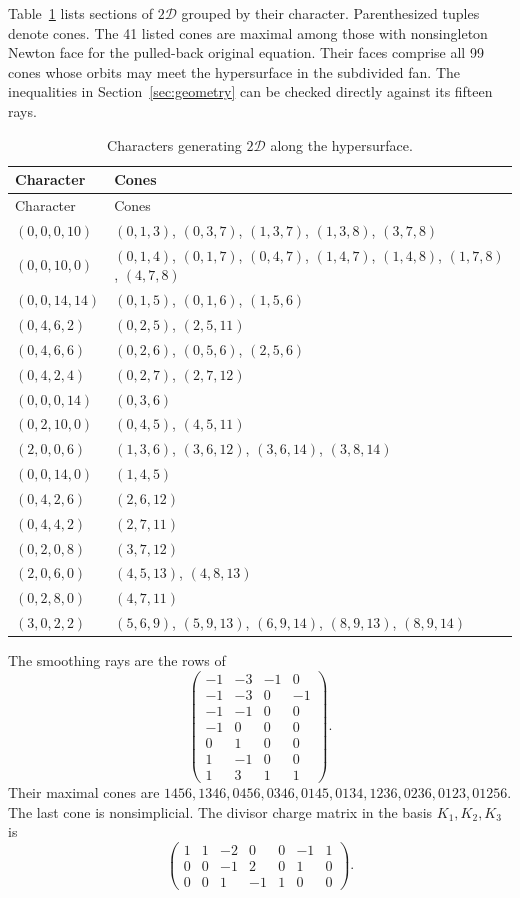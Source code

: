 Table~\ref{tab:characters} lists sections of $2\mathcal D$ grouped
by their character. Parenthesized tuples denote cones. The 41 listed
cones are maximal among those with nonsingleton Newton face for the
pulled-back original equation. Their faces comprise all 99 cones whose
orbits may meet the hypersurface in the subdivided fan. The inequalities in Section~\ref{sec:geometry} can
be checked directly against its fifteen rays.
\begingroup\small
\begin{longtable}{p{}p{}}
\caption{Characters generating $2\mathcal D$ along the hypersurface.}
\label{tab:characters}\\
\toprule Character & Cones\\\midrule\endfirsthead
\toprule Character & Cones\\\midrule\endhead
$(0,0,0,10)$ & $(0,1,3)$, $(0,3,7)$, $(1,3,7)$, $(1,3,8)$, $(3,7,8)$\\[3pt]
$(0,0,10,0)$ & $(0,1,4)$, $(0,1,7)$, $(0,4,7)$, $(1,4,7)$, $(1,4,8)$, $(1,7,8)$, $(4,7,8)$\\[3pt]
$(0,0,14,14)$ & $(0,1,5)$, $(0,1,6)$, $(1,5,6)$\\[3pt]
$(0,4,6,2)$ & $(0,2,5)$, $(2,5,11)$\\[3pt]
$(0,4,6,6)$ & $(0,2,6)$, $(0,5,6)$, $(2,5,6)$\\[3pt]
$(0,4,2,4)$ & $(0,2,7)$, $(2,7,12)$\\[3pt]
$(0,0,0,14)$ & $(0,3,6)$\\[3pt]
$(0,2,10,0)$ & $(0,4,5)$, $(4,5,11)$\\[3pt]
$(2,0,0,6)$ & $(1,3,6)$, $(3,6,12)$, $(3,6,14)$, $(3,8,14)$\\[3pt]
$(0,0,14,0)$ & $(1,4,5)$\\[3pt]
$(0,4,2,6)$ & $(2,6,12)$\\[3pt]
$(0,4,4,2)$ & $(2,7,11)$\\[3pt]
$(0,2,0,8)$ & $(3,7,12)$\\[3pt]
$(2,0,6,0)$ & $(4,5,13)$, $(4,8,13)$\\[3pt]
$(0,2,8,0)$ & $(4,7,11)$\\[3pt]
$(3,0,2,2)$ & $(5,6,9)$, $(5,9,13)$, $(6,9,14)$, $(8,9,13)$, $(8,9,14)$\\[3pt]
\bottomrule\end{longtable}\endgroup

The smoothing rays are the rows of
\[
\begin{pmatrix}
-1&-3&-1&0\\-1&-3&0&-1\\-1&-1&0&0\\-1&0&0&0\\
0&1&0&0\\1&-1&0&0\\1&3&1&1
\end{pmatrix}.
\]
Their maximal cones are
$1456,1346,0456,0346,0145,0134,1236,0236,0123,01256$.
The last cone is nonsimplicial. The divisor charge matrix in the
basis $K_1,K_2,K_3$ is
\[
\begin{pmatrix}
1&1&-2&0&0&-1&1\\0&0&-1&2&0&1&0\\0&0&1&-1&1&0&0
\end{pmatrix}.
\]

